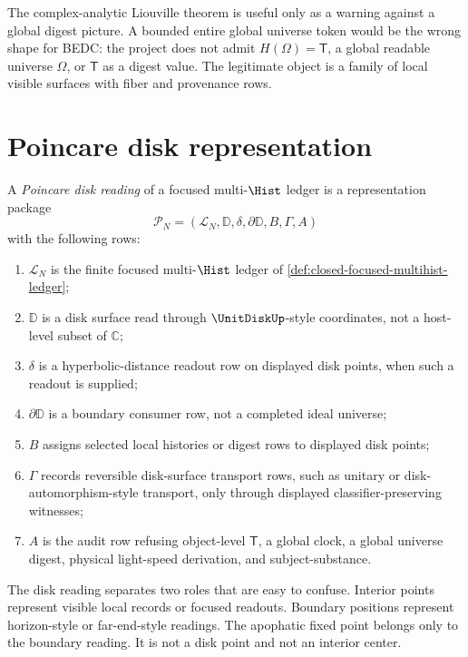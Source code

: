 \begin{remark}
\label{rem:hyperbolic-complex-liouville-warning}
The complex-analytic Liouville theorem is useful only as a warning against a global digest picture. A bounded entire global universe token would be the wrong shape for BEDC: the project does not admit $H(\Omega)=\mathsf{T}$, a global readable universe $\Omega$, or $\mathsf{T}$ as a digest value. The legitimate object is a family of local visible surfaces with fiber and provenance rows.
\end{remark}

\section{Poincare disk representation}
\label{sec:hyperbolic-poincare-disk}

\begin{definition}
\label{def:hyperbolic-poincare-disk-reading}
A \emph{Poincare disk reading} of a focused multi-$\Hist$ ledger is a representation package
$$
\mathcal{P}_N=(\mathcal{L}_N,\mathbb{D},\delta,\partial\mathbb{D},B,\Gamma,A)
$$
with the following rows:
\begin{enumerate}
\item $\mathcal{L}_N$ is the finite focused multi-$\Hist$ ledger of \autoref{def:closed-focused-multihist-ledger};
\item $\mathbb{D}$ is a disk surface read through $\UnitDiskUp$-style coordinates, not a host-level subset of $\mathbb{C}$;
\item $\delta$ is a hyperbolic-distance readout row on displayed disk points, when such a readout is supplied;
\item $\partial\mathbb{D}$ is a boundary consumer row, not a completed ideal universe;
\item $B$ assigns selected local histories or digest rows to displayed disk points;
\item $\Gamma$ records reversible disk-surface transport rows, such as unitary or disk-automorphism-style transport, only through displayed classifier-preserving witnesses;
\item $A$ is the audit row refusing object-level $\mathsf{T}$, a global clock, a global universe digest, physical light-speed derivation, and subject-substance.
\end{enumerate}
\end{definition}

The disk reading separates two roles that are easy to confuse. Interior points represent visible local records or focused readouts. Boundary positions represent horizon-style or far-end-style readings. The apophatic fixed point belongs only to the boundary reading. It is not a disk point and not an interior center.

